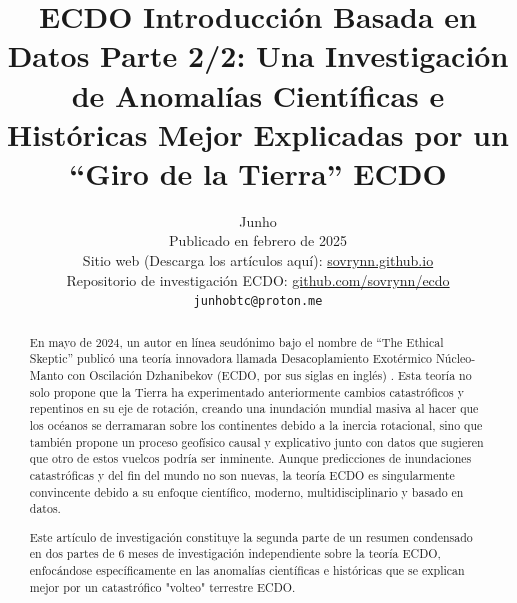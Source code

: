 \documentclass[10pt,twocolumn,letterpaper]{article}
\begin{document}
\title{ECDO Introducción Basada en Datos Parte 2/2: Una Investigación de Anomalías Científicas e Históricas Mejor Explicadas por un “Giro de la Tierra” ECDO}

\author{Junho\\
Publicado en febrero de 2025\\
Sitio web (Descarga los artículos aquí): \href{https://sovrynn.github.io}{sovrynn.github.io}\\
Repositorio de investigación ECDO: \href{https://github.com/sovrynn/ecdo}{github.com/sovrynn/ecdo}\\
{\tt\small junhobtc@proton.me}
}

\maketitle

\begin{abstract}
En mayo de 2024, un autor en línea seudónimo bajo el nombre de “The Ethical Skeptic” \cite{0} publicó una teoría innovadora llamada Desacoplamiento Exotérmico Núcleo-Manto con Oscilación Dzhanibekov (ECDO, por sus siglas en inglés) \cite{1}. Esta teoría no solo propone que la Tierra ha experimentado anteriormente cambios catastróficos y repentinos en su eje de rotación, creando una inundación mundial masiva al hacer que los océanos se derramaran sobre los continentes debido a la inercia rotacional, sino que también propone un proceso geofísico causal y explicativo junto con datos que sugieren que otro de estos vuelcos podría ser inminente. Aunque predicciones de inundaciones catastróficas y del fin del mundo no son nuevas, la teoría ECDO es singularmente convincente debido a su enfoque científico, moderno, multidisciplinario y basado en datos.

Este artículo de investigación constituye la segunda parte de un resumen condensado en dos partes de 6 meses de investigación independiente \cite{2,20} sobre la teoría ECDO, enfocándose específicamente en las anomalías científicas e históricas que se explican mejor por un catastrófico "volteo" terrestre ECDO.

\end{abstract}
\end{document}
